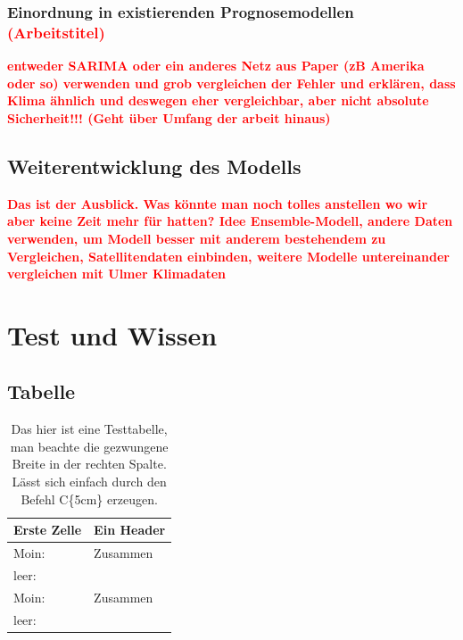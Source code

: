 \documentclass[
12pt, %
toc=listofnumbered, %
toc=chapterentrydotfill, %
numbers=noenddot, %
captions=tableheading, %
]{scrreprt}
\let\Oldsection\section
\renewcommand{\section}{\FloatBarrier\Oldsection}
\let\Oldsubsection\subsection
\renewcommand{\subsection}{\FloatBarrier\Oldsubsection}
\newcommand{\highlight}[1]{\textbf{\textcolor{red}{#1}}}
\begin{document}
\subsection{Einordnung in existierenden Prognosemodellen \highlight{(Arbeitstitel)}}
\highlight{entweder SARIMA oder ein anderes Netz aus Paper (zB Amerika oder so) verwenden und grob vergleichen der Fehler und erklären, dass
 Klima ähnlich und deswegen eher vergleichbar, aber nicht absolute Sicherheit!!! (Geht über Umfang der arbeit hinaus)}

\section{Weiterentwicklung des Modells}
\highlight{Das ist der Ausblick. Was könnte man noch tolles anstellen wo wir aber keine Zeit mehr für hatten? Idee Ensemble-Modell, andere Daten 
verwenden, um Modell besser mit anderem bestehendem zu Vergleichen, Satellitendaten einbinden, weitere Modelle untereinander vergleichen mit Ulmer Klimadaten}

\chapter{Test und Wissen}

\section{Tabelle}
\begin{table}[ht]
	\centering
	\caption{Das hier ist eine Testtabelle, man beachte die gezwungene Breite in der rechten Spalte. Lässt sich einfach durch den Befehl C\{5cm\} erzeugen.}
	\begin{tabular}{|l|C{5cm}|}
		\hline
		\textbf{Erste Zelle}&\textbf{Ein Header}\\
		\hline
		Moin: & Zusammen\\\hline
		leer:&\\\hline
		Moin: & Zusammen\\\hline
		leer:&\\\hline
	\end{tabular}
\label{tab:testtabelle}
\end{table}
\end{document}
